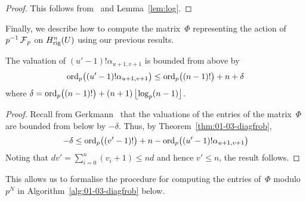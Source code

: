 \begin{proof}
This follows from~\citep[\S 6.2]{Lau04} and Lemma~\ref{lem:log}.
\end{proof}

Finally, we describe how to compute the matrix~$\Phi$ representing 
the action of $p^{-1} \operatorname{\mathcal{F}}_p$ on $H_{\text{rig}}^{n}(U)$ using our previous 
results.

\begin{prop}
The valuation of $(u'-1)! \alpha_{u+1,v+1}$ is bounded from above by 
\begin{equation*}
\operatorname{ord}_p\bigl((u'-1)! \alpha_{u+1,v+1}\bigr) 
    \leq \operatorname{ord}_p\bigl((n-1)!\bigr) + n + \delta
\end{equation*}
where $\delta = \operatorname{ord}_p\bigl((n-1)!\bigr) + (n+1) \left\lfloor\log_p(n-1)\right\rfloor$. 
\end{prop}

\begin{proof}
Recall from Gerkmann~\citep[Lemma~3.3]{Gerkmann2007} that the valuations 
of the entries of the matrix~$\Phi$ are bounded from below by $-\delta$. 
Thus, by Theorem~\ref{thm:01-03-diagfrob}, 
\begin{equation*}
-\delta \leq \operatorname{ord}_p\bigl((v'-1)!\bigr) + n 
           - \operatorname{ord}_p\bigl((u'-1)! \alpha_{u+1,v+1}\bigr)
\end{equation*}
Noting that $d v' = \sum_{i=0}^n (v_i + 1) \leq n d$ and 
hence $v' \leq n$, the result follows.
\end{proof}

This allows us to formalise the procedure for computing the 
entries of~$\Phi$ modulo~$p^N$ in Algorithm~\ref{alg:01-03-diagfrob} 
below.

